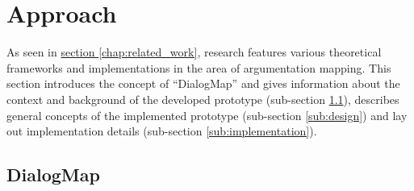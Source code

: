 \section{Approach}
\label{chap:approach}

As seen in \hyperref[chap:related_work]{section \ref{chap:related_work}}, research features various theoretical frameworks and implementations in the area of argumentation mapping. This section introduces the concept of ``DialogMap'' and gives information about the context and background of the developed prototype (sub-section \ref{sub:dialogmap}), describes general concepts of the implemented prototype (sub-section \ref{sub:design}) and lay out implementation details (sub-section \ref{sub:implementation}).

\subsection{DialogMap}
\label{sub:dialogmap}

